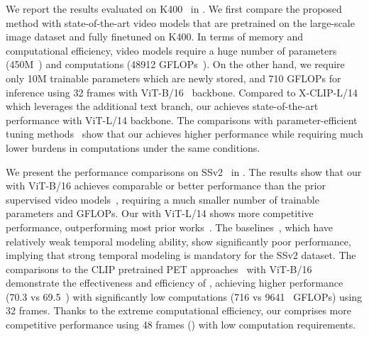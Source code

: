    We report the results evaluated on K400~\cite{k400} in .
    We first compare the proposed method with state-of-the-art video models that are pretrained on the large-scale image dataset and fully finetuned on K400.
    In terms of memory and computational efficiency, video models require a huge number of parameters (450M~\cite{tokenlearner}) and computations (48912 GFLOPs~\cite{tokenlearner}).
    On the other hand, we require only 10M trainable parameters which are newly stored, and 710 GFLOPs for inference using 32 frames with ViT-B/16~\cite{vit} backbone.
    Compared to X-CLIP-L/14~\cite{x-clip} which leverages the additional text branch, our \method achieves state-of-the-art performance with ViT-L/14 backbone.
    The comparisons with parameter-efficient tuning methods~\cite{frozen-clip, st-adapter} show that our \method achieves higher performance while requiring much lower burdens in computations under the same conditions.
    
    We present the performance comparisons on SSv2~\cite{ssv2} in .
    The results show that our \method with ViT-B/16 achieves comparable or better performance than the prior supervised video models~\cite{space-time, multiview, multiscale, vivit}, requiring a much smaller number of trainable parameters and GFLOPs.
    Our \method with ViT-L/14 shows more competitive performance, outperforming most prior works~\cite{multiscale-v2, uniformer, omnivore}.
    The baselines~\cite{videoprompt, vpt, adaptformer, protuning}, which have relatively weak temporal modeling ability, show significantly poor performance, implying that strong temporal modeling is mandatory for the SSv2 dataset.
    The comparisons to the CLIP pretrained PET approaches~\cite{frozen-clip, st-adapter} with ViT-B/16 demonstrate the effectiveness and efficiency of \method, achieving higher performance (70.3 vs 69.5~\cite{st-adapter}) with significantly low computations (716 vs 9641~\cite{frozen-clip} GFLOPs) using 32 frames.
    Thanks to the extreme computational efficiency, our \method comprises more competitive performance using 48 frames () with low computation requirements.
    
